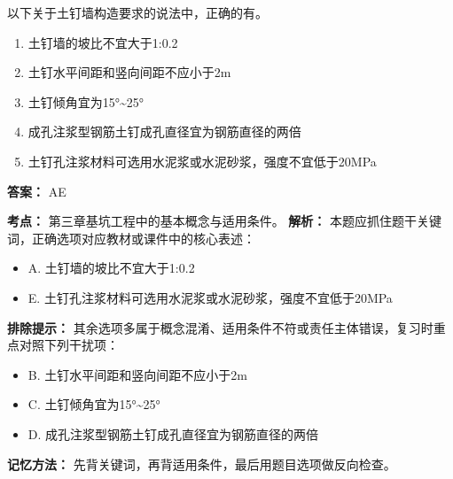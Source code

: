 \documentclass[UTF8,fontset=fandol,11pt]{ctexart}
\begin{document}
\begin{quizbox}[title={第 8 题}]
以下关于土钉墙构造要求的说法中，正确的有。\\
\begin{enumerate}[label=\Alph*.]
\item 土钉墙的坡比不宜大于1:0.2
\item 土钉水平间距和竖向间距不应小于2m
\item 土钉倾角宜为15°\textasciitilde{}25°
\item 成孔注浆型钢筋土钉成孔直径宜为钢筋直径的两倍
\item 土钉孔注浆材料可选用水泥浆或水泥砂浆，强度不宜低于20MPa
\end{enumerate}
\textbf{答案：} AE
\vspace{0.25em}
\begin{answerbox}[title={考点解析}]
\textbf{考点：} 第三章基坑工程中的基本概念与适用条件。
\textbf{解析：} 本题应抓住题干关键词，正确选项对应教材或课件中的核心表述：
\begin{itemize}
\item A. 土钉墙的坡比不宜大于1:0.2
\item E. 土钉孔注浆材料可选用水泥浆或水泥砂浆，强度不宜低于20MPa
\end{itemize}
\textbf{排除提示：} 其余选项多属于概念混淆、适用条件不符或责任主体错误，复习时重点对照下列干扰项：
\begin{itemize}
\item B. 土钉水平间距和竖向间距不应小于2m
\item C. 土钉倾角宜为15°\textasciitilde{}25°
\item D. 成孔注浆型钢筋土钉成孔直径宜为钢筋直径的两倍
\end{itemize}
\textbf{记忆方法：} 先背关键词，再背适用条件，最后用题目选项做反向检查。
\end{answerbox}
\end{quizbox}

\vspace{0.2em}
\end{document}

